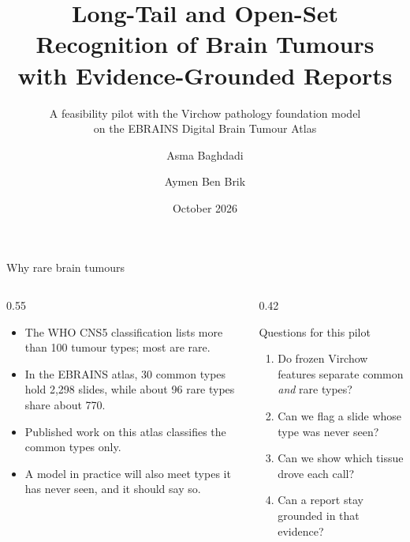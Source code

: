 \documentclass[aspectratio=169,11pt]{beamer}
\title{Long-Tail and Open-Set Recognition of Brain Tumours\\with Evidence-Grounded Reports}
\subtitle{A feasibility pilot with the Virchow pathology foundation model\\on the EBRAINS Digital Brain Tumour Atlas}
\author{Asma Baghdadi \and Aymen Ben Brik}
\date{October 2026}
\begin{document}
\begin{frame}[plain]
  \titlepage
\end{frame}

\begin{frame}{Why rare brain tumours}
  \begin{columns}[T]
    \begin{column}{0.55\textwidth}
      \begin{itemize}
        \item The WHO CNS5 classification lists more than 100 tumour types; most are rare.
        \item In the EBRAINS atlas, 30 common types hold 2{,}298 slides, while about 96 rare types share about 770.
        \item Published work on this atlas classifies the common types only.
        \item A model in practice will also meet types it has never seen, and it should say so.
      \end{itemize}
    \end{column}
    \begin{column}{0.42\textwidth}
      \begin{block}{Questions for this pilot}
        \begin{enumerate}
          \item Do frozen Virchow features separate common \emph{and} rare types?
          \item Can we flag a slide whose type was never seen?
          \item Can we show which tissue drove each call?
          \item Can a report stay grounded in that evidence?
        \end{enumerate}
      \end{block}
    \end{column}
  \end{columns}
\end{frame}
\end{document}
